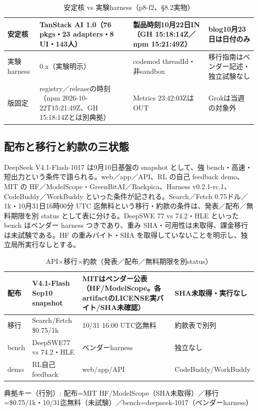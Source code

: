 \documentclass[lualatex,a4paper,10pt]{jlreq}
\begin{document}
\begin{table}[htbp]\centering\footnotesize
\caption{安定核 vs 実験harness（p8-f2、§8.2実物）}
\begin{tabularx}{0.96\linewidth}{@{}lXXX@{}}
\toprule
安定核 & TanStack AI 1.0（76 pkgs・23 adapters・8 UI・143人） & 製品時刻10月22日IN（GH 15:18:14Z／npm 15:21:49Z） & blog10月23日は日付のみ \\
\midrule
実験harness & 0.x（実験明示） & codemod threadId・非sandbox & 移行指南はベンダー記述・独立試験なし \\
版固定 & registry／releaseの時刻（npm 2026-10-22T15:21:49Z、GH 15:18:14Zとは別典拠） & Metrics 23:42:03ZはOUT & Grokは当週の対象外 \\
\bottomrule
\end{tabularx}
\end{table}


\subsection*{配布と移行と約款の三状態}


DeepSeek V4.1-Flash-1017 は9月10日基盤の snapshot として、強 bench・高速・短出力という条件で語られる。web／app／API、RL の自己 feedback demo、MIT の HF／ModelScope・GreenBitAI／Baekpica、Harness v0.2.1-rc.1、CodeBuddy／WorkBuddy といった条件が記される。Search／Fetch 0.75ドル／1k・10月31日16時00分 UTC 迄無料という移行・約款の条件は、発表／配布／無料期限を別 status として表に分ける。DeepSWE 77 vs 74.2・HLE といった bench はベンダー harness つきであり、重み SHA・可用性は未取得、課金移行は未試験である。HF の重みバイト・SHA を取得していないことを明示し、独立局所実行なしとする。


\begin{table}[htbp]\centering\footnotesize
\caption{API×移行×約款（発表／配布／無料期限を別status）}
\begin{tabularx}{0.96\linewidth}{@{}lXXX@{}}
\toprule
配布 & V4.1-Flash Sep10 snapshot & MITはベンダー公表（HF/ModelScope。各artifactのLICENSE実バイト/SHA未確認） & SHA未取得・実行なし \\
\midrule
移行 & Search/Fetch \$0.75/1k & 10/31 16:00 UTC迄無料 & 約款表で別列 \\
bench & DeepSWE77 vs 74.2・HLE & ベンダーharness & 独立なし \\
demo & RL自己feedback & web/app/API & CodeBuddy/WorkBuddy \\
\bottomrule
\end{tabularx}
{\scriptsize\color{SurveyMuted} 典拠キー（行別）: 配布=MIT HF/ModelScope（SHA未取得）／移行=\$0.75/1k・10/31迄無料（未試験）／bench=deepseek-1017（ベンダーharness）\par}
\end{table}
\end{document}
